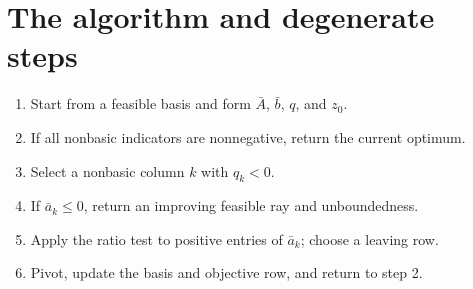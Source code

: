 \documentclass[11pt,a4paper]{article}
\begin{document}
\section{The algorithm and degenerate steps}\label{sec:algorithm}
\begin{enumerate}[leftmargin=*]
  \item Start from a feasible basis and form $\bar A$, $\bar b$, $q$, and $z_0$.
  \item If all nonbasic indicators are nonnegative, return the current optimum.
  \item Select a nonbasic column $k$ with $q_k<0$.
  \item If $\bar a_k\leq0$, return an improving feasible ray and unboundedness.
  \item Apply the ratio test to positive entries of $\bar a_k$; choose a leaving row.
  \item Pivot, update the basis and objective row, and return to step 2.
\end{enumerate}
\end{document}
